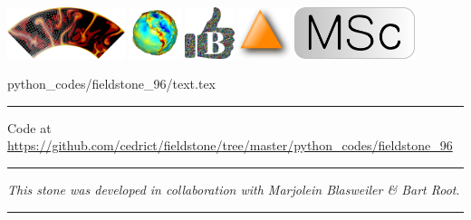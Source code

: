 
\includegraphics[height=1.5cm]{images/pictograms/aspect_logo}
\includegraphics[height=1.5cm]{images/pictograms/gravity}
\includegraphics[height=1.5cm]{images/pictograms/benchmark}
\includegraphics[height=1.5cm]{images/pictograms/triangle}
\includegraphics[height=1.5cm]{images/pictograms/msc}


\begin{flushright} {\tiny {\color{gray} python\_codes/fieldstone\_96/text.tex}} \end{flushright}



\par\noindent\rule{\textwidth}{0.4pt}

\begin{center}
Code at \url{https://github.com/cedrict/fieldstone/tree/master/python_codes/fieldstone_96}
\end{center}

\par\noindent\rule{\textwidth}{0.4pt}

{\sl This stone was developed in collaboration with Marjolein Blasweiler \& Bart Root}. 
 

\par\noindent\rule{\textwidth}{0.4pt}






